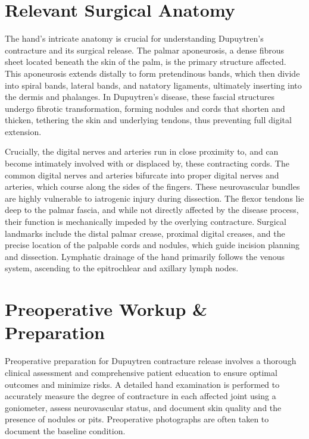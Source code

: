 \section*{Relevant Surgical Anatomy}
The hand's intricate anatomy is crucial for understanding Dupuytren's contracture and its surgical release. The palmar aponeurosis, a dense fibrous sheet located beneath the skin of the palm, is the primary structure affected. This aponeurosis extends distally to form pretendinous bands, which then divide into spiral bands, lateral bands, and natatory ligaments, ultimately inserting into the dermis and phalanges. In Dupuytren's disease, these fascial structures undergo fibrotic transformation, forming nodules and cords that shorten and thicken, tethering the skin and underlying tendons, thus preventing full digital extension.

Crucially, the digital nerves and arteries run in close proximity to, and can become intimately involved with or displaced by, these contracting cords. The common digital nerves and arteries bifurcate into proper digital nerves and arteries, which course along the sides of the fingers. These neurovascular bundles are highly vulnerable to iatrogenic injury during dissection. The flexor tendons lie deep to the palmar fascia, and while not directly affected by the disease process, their function is mechanically impeded by the overlying contracture. Surgical landmarks include the distal palmar crease, proximal digital creases, and the precise location of the palpable cords and nodules, which guide incision planning and dissection. Lymphatic drainage of the hand primarily follows the venous system, ascending to the epitrochlear and axillary lymph nodes.

\section*{Preoperative Workup \& Preparation}
Preoperative preparation for Dupuytren contracture release involves a thorough clinical assessment and comprehensive patient education to ensure optimal outcomes and minimize risks. A detailed hand examination is performed to accurately measure the degree of contracture in each affected joint using a goniometer, assess neurovascular status, and document skin quality and the presence of nodules or pits. Preoperative photographs are often taken to document the baseline condition.

